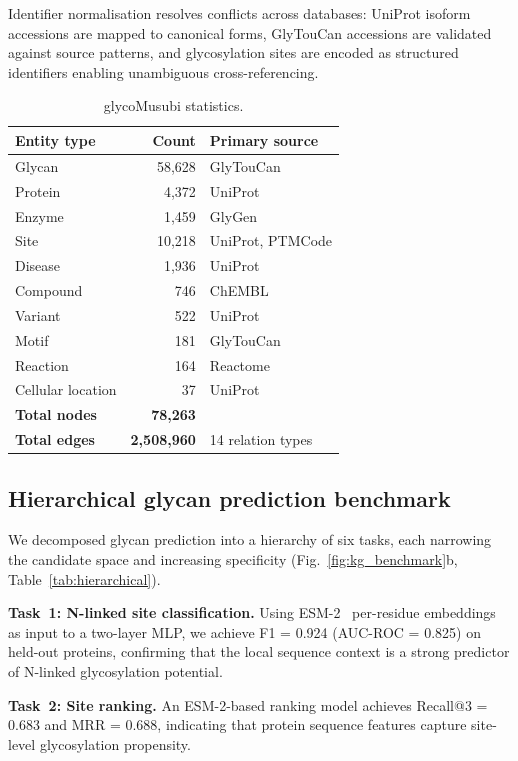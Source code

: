\documentclass[11pt,a4paper]{article}
\begin{document}
Identifier normalisation resolves conflicts across databases: UniProt isoform
accessions are mapped to canonical forms, GlyTouCan accessions are validated
against source patterns, and glycosylation sites are encoded as structured
identifiers enabling unambiguous cross-referencing.

\begin{table}[ht]
\centering
\caption{glycoMusubi statistics.}
\label{tab:stats}
\small
\begin{tabular}{lrl}
\toprule
\textbf{Entity type} & \textbf{Count} & \textbf{Primary source} \\
\midrule
Glycan & 58,628 & GlyTouCan \\
Protein & 4,372 & UniProt \\
Enzyme & 1,459 & GlyGen \\
Site & 10,218 & UniProt, PTMCode \\
Disease & 1,936 & UniProt \\
Compound & 746 & ChEMBL \\
Variant & 522 & UniProt \\
Motif & 181 & GlyTouCan \\
Reaction & 164 & Reactome \\
Cellular location & 37 & UniProt \\
\midrule
\textbf{Total nodes} & \textbf{78,263} & \\
\textbf{Total edges} & \textbf{2,508,960} & 14 relation types \\
\bottomrule
\end{tabular}
\end{table}

\subsection{Hierarchical glycan prediction benchmark}

We decomposed glycan prediction into a hierarchy of six tasks, each narrowing
the candidate space and increasing specificity
(Fig.~\ref{fig:kg_benchmark}b, Table~\ref{tab:hierarchical}).

\textbf{Task~1: N-linked site classification.} Using ESM-2~\cite{lin2023}
per-residue embeddings as input to a two-layer MLP, we achieve F1 = 0.924
(AUC-ROC = 0.825) on held-out proteins, confirming that the local sequence
context is a strong predictor of N-linked glycosylation potential.

\textbf{Task~2: Site ranking.} An ESM-2-based ranking model achieves
Recall@3 = 0.683 and MRR = 0.688, indicating that protein sequence features
capture site-level glycosylation propensity.
\end{document}
